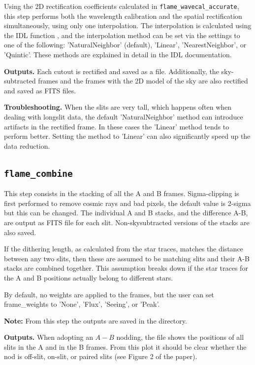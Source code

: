 \documentclass[a4paper]{article}
\begin{document}
\begin{sloppypar}
Using the 2D rectification coefficients calculated in \texttt{flame\_wavecal\_accurate}, this step performs both the wavelength calibration and the spatial rectification simultaneously, using only one interpolation. The interpolation is calculated using the IDL function , and the interpolation method can be set via the settings to one of the following: 'NaturalNeighbor' (default), 'Linear', 'NearestNeighbor', or 'Quintic'. These methods are explained in detail in the IDL documentation.

\medskip
\noindent
\textbf{Outputs.} Each cutout is rectified and saved as a  file. Additionally, the sky-subtracted frames and the frames with the 2D model of the sky are also rectified and saved as FITS files.

\medskip
\noindent
\textbf{Troubleshooting.} When the slits are very tall, which happens often when dealing with longslit data, the default 'NaturalNeighbor' method can introduce artifacts in the rectified frame. In these cases the 'Linear' method tends to perform better. Setting the method to 'Linear' can also significantly speed up the data reduction.



\subsection{\texttt{flame\_combine}}

This step consists in the stacking of all the A and B frames. Sigma-clipping is first performed to remove cosmic rays and bad pixels, the default value is 2-sigma but this can be changed. The individual A and B stacks, and the difference A-B, are output as FITS file for each slit. Non-skysubtracted versions of the stacks are also saved.

If the dithering length, as calculated from the star traces, matches the distance between any two slits, then these are assumed to be matching slits and their A-B stacks are combined together. This assumption breaks down if the star traces for the A and B positions actually belong to different stars.

By default, no weights are applied to the frames, but the user can set frame\_weights to 'None', 'Flux', 'Seeing', or 'Peak'.

\medskip
\noindent
\textbf{Note:} From this step the outputs are saved in the  directory.

\medskip
\noindent
\textbf{Outputs.} When adopting an $A-B$ nodding, the file  shows the positions of all slits in the A and in the B frames. From this plot it should be clear whether the nod is off-slit, on-slit, or paired slits (see Figure 2 of the paper).


\end{sloppypar}
\end{document}
